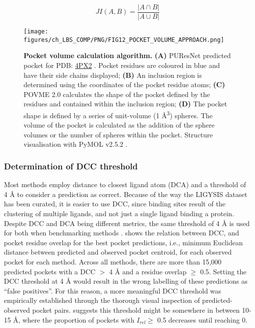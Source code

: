 \begin{equation}
JI(A, B) = \frac{|A \cap B|}{|A \cup B|}
\label{eq:jaccard_index}
\end{equation}

\begin{figure}[h]
    \centering
    \texttt{[image: figures/ch\_LBS\_COMP/PNG/FIG12\_POCKET\_VOLUME\_APPROACH.png]}
    \caption[Pocket volume calculation algorithm]{\textbf{Pocket volume calculation algorithm.} \textbf{(A)} PUResNet predicted pocket for PDB: \href{https://www.ebi.ac.uk/pdbe/entry/pdb/4PX2}{4PX2} \cite{PDB_4PX2}. Pocket residues are coloured in blue and have their side chains displayed; \textbf{(B)} An inclusion region is determined using the coordinates of the pocket residue atoms; \textbf{(C)} POVME 2.0 calculates the shape of the pocket defined by the residues and contained within the inclusion region; \textbf{(D)} The pocket shape is defined by a series of unit-volume (1 \AA{}\textsuperscript{3}) spheres. The volume of the pocket is calculated as the addition of the sphere volumes or the number of spheres within the pocket. Structure visualisation with PyMOL v2.5.2 \cite{SCHRODINGER_2015_PYMOL}.}
    \label{fig:protein_volume_approach}
\end{figure}

\subsubsection{Determination of DCC threshold}

Most methods employ distance to closest ligand atom  (DCA) and a threshold of 4 \AA{} to consider a prediction as correct. Because of the way the LIGYSIS dataset has been curated, it is easier to use DCC, since binding sites result of the clustering of multiple ligands, and not just a single ligand binding a protein. Despite DCC and DCA being different metrics, the same threshold of 4 \AA{} is used for both when benchmarking methods \cite{AGGARWAL_2022_DEEPPOCKET, SESTAK_2024_VNEGNN, KANDEL_2021_PURESNET}.  shows the relation between DCC, and pocket residue overlap for the best pocket predictions, i.e., minimum Euclidean distance between predicted and observed pocket centroid, for each observed pocket for each method. Across all methods, there are more than 15,000 predicted pockets with a DCC $>$ 4 \AA{} and a residue overlap $\geq$ 0.5. Setting the DCC threshold at 4 \AA{} would result in the wrong labelling of these predictions as ``false positives''. For this reason, a more meaningful DCC threshold was empirically established through the thorough visual inspection of predicted-observed pocket pairs.  suggests this threshold might be somewhere in between 10-15 \AA{}, where the proportion of pockets with $I_{rel} \geq$ 0.5 decreases until reaching 0.

